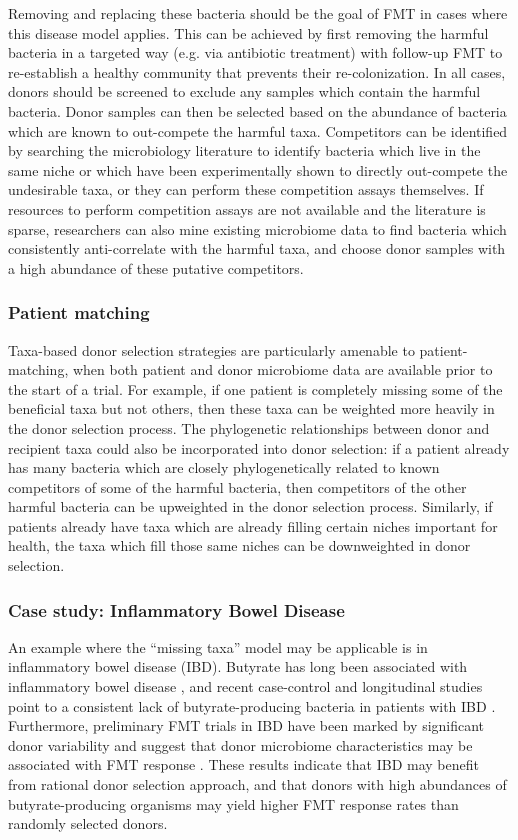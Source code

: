 Removing and replacing these bacteria should be the goal of FMT in cases where this disease model applies.
This can be achieved by first removing the harmful bacteria in a targeted way (e.g. via antibiotic treatment) with follow-up FMT to re-establish a healthy community that prevents their re-colonization.
In all cases, donors should be screened to exclude any samples which contain the harmful bacteria.
Donor samples can then be selected based on the abundance of bacteria which are known to out-compete the harmful taxa.
Competitors can be identified by searching the microbiology literature to identify bacteria which live in the same niche or which have been experimentally shown to directly out-compete the undesirable taxa, or they can perform these competition assays themselves.
If resources to perform competition assays are not available and the literature is sparse, researchers can also mine existing microbiome data to find bacteria which consistently anti-correlate with the harmful taxa, and choose donor samples with a high abundance of these putative competitors.

\subsubsection{Patient matching}

Taxa-based donor selection strategies are particularly amenable to patient-matching, when both patient and donor microbiome data are available prior to the start of a trial.
For example, if one patient is completely missing some of the beneficial taxa but not others, then these taxa can be weighted more heavily in the donor selection process.
The phylogenetic relationships between donor and recipient taxa could also be incorporated into donor selection: if a patient already has many bacteria which are closely phylogenetically related to known competitors of some of the harmful bacteria, then competitors of the other harmful bacteria can be upweighted in the donor selection process.
Similarly, if patients already have taxa which are already filling certain niches important for health, the taxa which fill those same niches can be downweighted in donor selection.

\subsubsection{Case study: Inflammatory Bowel Disease}

An example where the “missing taxa” model may be applicable is in inflammatory bowel disease (IBD).
Butyrate has long been associated with inflammatory bowel disease \cite{Scheppach1992}, and recent case-control and longitudinal studies point to a consistent lack of butyrate-producing bacteria in patients with IBD \cite{Duvallet2017,Schirmer2018}.
Furthermore, preliminary FMT trials in IBD have been marked by significant donor variability and suggest that donor microbiome characteristics may be associated with FMT response \cite{Moayyedi2015,Kump2018}.
These results indicate that IBD may benefit from rational donor selection approach, and that donors with high abundances of butyrate-producing organisms may yield higher FMT response rates than randomly selected donors.

